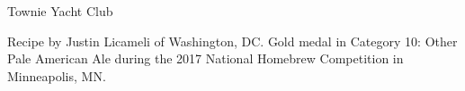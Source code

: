 \begin{recipe}{Townie Yacht Club}

\begin{aboutblock}
Recipe by Justin Licameli of Washington, DC. Gold medal in Category 10: Other Pale
American Ale during the 2017 National Homebrew Competition in Minneapolis, MN.
\sourceaha
\end{aboutblock}


\begin{methodandtiming}

\begin{mashsteps}
\end{mashsteps}

\begin{fermentationsteps}
\end{fermentationsteps}

\end{methodandtiming}

\recipebreak

\begin{ingredientsblock}

\begin{malts}
\end{malts}

\begin{hops}
\end{hops}


\end{ingredientsblock}

\end{recipe}

